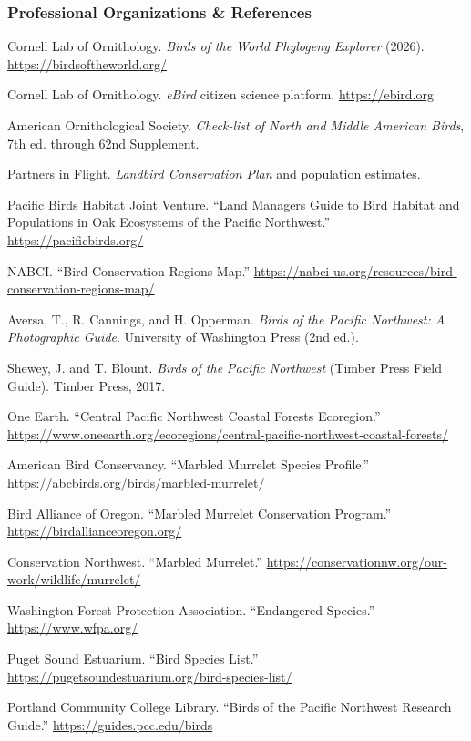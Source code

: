 \documentclass[11pt,letterpaper]{article}
\begin{document}
\subsubsection{Professional Organizations \& References}
\begin{enumerate}[leftmargin=2em, label={[O\arabic*]}]
\item Cornell Lab of Ornithology. \textit{Birds of the World Phylogeny Explorer} (2026). \url{https://birdsoftheworld.org/}
\item Cornell Lab of Ornithology. \textit{eBird} citizen science platform. \url{https://ebird.org}
\item American Ornithological Society. \textit{Check-list of North and Middle American Birds}, 7th ed. through 62nd Supplement.
\item Partners in Flight. \textit{Landbird Conservation Plan} and population estimates.
\item Pacific Birds Habitat Joint Venture. ``Land Managers Guide to Bird Habitat and Populations in Oak Ecosystems of the Pacific Northwest.'' \url{https://pacificbirds.org/}
\item NABCI. ``Bird Conservation Regions Map.'' \url{https://nabci-us.org/resources/bird-conservation-regions-map/}
\item Aversa, T., R. Cannings, and H. Opperman. \textit{Birds of the Pacific Northwest: A Photographic Guide}. University of Washington Press (2nd ed.).
\item Shewey, J. and T. Blount. \textit{Birds of the Pacific Northwest} (Timber Press Field Guide). Timber Press, 2017.
\item One Earth. ``Central Pacific Northwest Coastal Forests Ecoregion.'' \url{https://www.oneearth.org/ecoregions/central-pacific-northwest-coastal-forests/}
\item American Bird Conservancy. ``Marbled Murrelet Species Profile.'' \url{https://abcbirds.org/birds/marbled-murrelet/}
\item Bird Alliance of Oregon. ``Marbled Murrelet Conservation Program.'' \url{https://birdallianceoregon.org/}
\item Conservation Northwest. ``Marbled Murrelet.'' \url{https://conservationnw.org/our-work/wildlife/murrelet/}
\item Washington Forest Protection Association. ``Endangered Species.'' \url{https://www.wfpa.org/}
\item Puget Sound Estuarium. ``Bird Species List.'' \url{https://pugetsoundestuarium.org/bird-species-list/}
\item Portland Community College Library. ``Birds of the Pacific Northwest Research Guide.'' \url{https://guides.pcc.edu/birds}
\end{enumerate}
\end{document}
